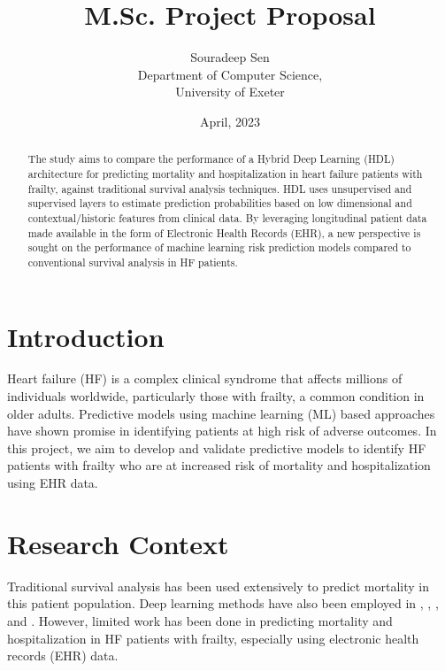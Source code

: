 \documentclass[%
 reprint,
 amsmath,amssymb,
 aps,
 nofootinbib,
]{revtex4-2}
\theoremstyle{definition}
\begin{document}

\title{M.Sc. Project Proposal}%
\author{Souradeep Sen \\
	 \small Department of Computer Science, \\ 
	 \small University of Exeter
	}

\date{April, 2023}%

\begin{abstract}
The study aims to compare the performance of a Hybrid Deep Learning (HDL) architecture for predicting mortality and hospitalization in heart failure patients with frailty, against traditional survival analysis techniques. HDL uses unsupervised and supervised layers to estimate prediction probabilities based on low dimensional and contextual/historic features from clinical data. By leveraging longitudinal patient data made available in the form of Electronic Health Records (EHR), a new perspective is sought on the performance of machine learning risk prediction models compared to conventional survival analysis in HF patients.
\end{abstract}

\maketitle

\section{\label{intro}Introduction}
Heart failure (HF) is a complex clinical syndrome that affects millions of individuals worldwide, particularly those with frailty, a common condition in older adults. Predictive models using machine learning (ML) based approaches have shown promise in identifying patients at high risk of adverse outcomes. In this project, we aim to develop and validate predictive models to identify HF patients with frailty who are at increased risk of mortality and hospitalization using EHR data. 

\section{\label{rescon}Research Context}
Traditional survival analysis has been used extensively to predict mortality in this patient population. Deep learning methods have also been employed in \citep{e2edlgjoreski}, \citep{nirschl2018deep}, \citep{10.1001/jamanetworkopen.2019.6972}, \citep{asolares2020} and \citep{lorenzoni_2019}. However, limited work has been done in predicting mortality and hospitalization in HF patients with frailty, especially using electronic health records (EHR) data.
\end{document}
